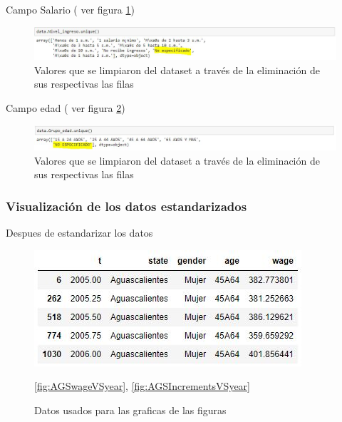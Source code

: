 Campo Salario ( ver figura \ref{fig:wageUnique_Standarization})
\begin{figure}[h!]
	\centering
	\includegraphics[width=1\linewidth]{Figure/wageUnique_Standarization.JPG}
	\caption{Valores que se limpiaron del dataset a trav\'es de la eliminaci\'on de sus respectivas las filas}
	\label{fig:wageUnique_Standarization}
\end{figure}

Campo edad ( ver figura \ref{fig:ageUnique_Standarization})
\begin{figure}[h!]
	\centering
	\includegraphics[width=1\linewidth]{Figure/ageUnique_Standarization.JPG}
	\caption{Valores que se limpiaron del dataset a trav\'es de la eliminaci\'on de sus respectivas las filas}
	\label{fig:ageUnique_Standarization}
\end{figure}

\subsubsection{Visualizaci\'on de los datos estandarizados}
Despues de estandarizar los datos 
\begin{figure}[h!]
	\centering
	\includegraphics[width=0.8\linewidth]{Figure/AGSdatos_visualizacion.JPG}
	\caption{Datos usados para las graficas de las figuras} \ref{fig:AGSwageVSyear}, \ref{fig:AGSIncrementsVSyear} 
	\label{fig:AGSdatos}
\end{figure}

